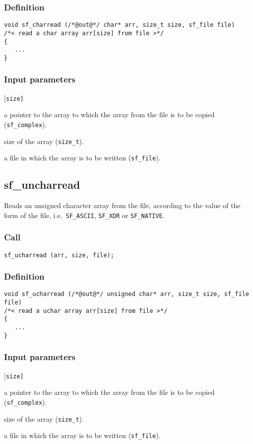 \subsubsection*{Definition}
\begin{verbatim}
void sf_charread (/*@out@*/ char* arr, size_t size, sf_file file)
/*< read a char array arr[size] from file >*/
{
   ...
}
\end{verbatim}

\subsubsection*{Input parameters}
\begin{desclist}{\tt }{\quad}[\tt size]
   \setlength\itemsep{0pt}
   \item[arr] a pointer to the array to which the array from the file is to be copied (\texttt{sf\_complex}). 
   \item[size] size of the array (\texttt{size\_t}). 
   \item[file] a file in which the array is to be written (\texttt{sf\_file}).
\end{desclist}




\subsection{{sf\_uncharread}}
Reads an unsigned character array from the file, according to the value of the form of the file, i.e.~\texttt{SF\_ASCII}, \texttt{SF\_XDR} or \texttt{SF\_NATIVE}.    

\subsubsection*{Call}
\begin{verbatim}sf_ucharread (arr, size, file);\end{verbatim}

\subsubsection*{Definition}
\begin{verbatim}
void sf_ucharread (/*@out@*/ unsigned char* arr, size_t size, sf_file file)
/*< read a uchar array arr[size] from file >*/
{
   ...
}
\end{verbatim}

\subsubsection*{Input parameters}
\begin{desclist}{\tt }{\quad}[\tt size]
   \setlength\itemsep{0pt}
   \item[arr]  a pointer to the array to which the array from the file is to be copied (\texttt{sf\_complex}). 
   \item[size] size of the array (\texttt{size\_t}). 
   \item[file] a file in which the array is to be written (\texttt{sf\_file}).
\end{desclist}




